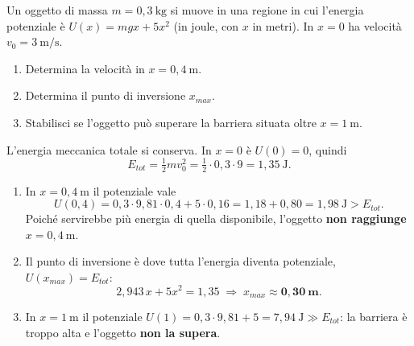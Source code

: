 \begin{question}[ID=3.5, subtitle={Moto in potenziale gravitazionale modificato U(x) = mgx + 5x²}, tags={conservazione energia, potenziale}, difficulty=difficile]
Un oggetto di massa $m = 0{,}3\ \text{kg}$ si muove in una regione in cui l'energia potenziale è $U(x) = mgx + 5x^2$ (in joule, con $x$ in metri). In $x = 0$ ha velocità $v_0 = 3\ \text{m/s}$.
\begin{enumerate}
    \item Determina la velocità in $x = 0{,}4\ \text{m}$.
    \item Determina il punto di inversione $x_{max}$.
    \item Stabilisci se l'oggetto può superare la barriera situata oltre $x = 1\ \text{m}$.
\end{enumerate}
\begin{solution}
L'energia meccanica totale si conserva. In $x = 0$ è $U(0) = 0$, quindi
\[
E_{tot} = \tfrac{1}{2}mv_0^2 = \tfrac{1}{2}\cdot 0{,}3\cdot 9 = 1{,}35\ \text{J}.
\]
\begin{enumerate}
    \item In $x = 0{,}4\ \text{m}$ il potenziale vale
    \[
    U(0{,}4) = 0{,}3\cdot 9{,}81\cdot 0{,}4 + 5\cdot 0{,}16 = 1{,}18 + 0{,}80 = 1{,}98\ \text{J} > E_{tot}.
    \]
    Poiché servirebbe più energia di quella disponibile, l'oggetto \textbf{non raggiunge} $x = 0{,}4\ \text{m}$.
    \item Il punto di inversione è dove tutta l'energia diventa potenziale, $U(x_{max}) = E_{tot}$:
    \[
    2{,}943\,x + 5x^2 = 1{,}35 \;\Rightarrow\; x_{max} \approx \mathbf{0{,}30\ \text{m}}.
    \]
    \item In $x = 1\ \text{m}$ il potenziale $U(1) = 0{,}3\cdot 9{,}81 + 5 = 7{,}94\ \text{J} \gg E_{tot}$: la barriera è troppo alta e l'oggetto \textbf{non la supera}.
\end{enumerate}
\end{solution}
\end{question}


